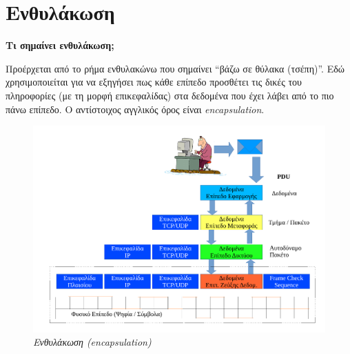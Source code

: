 %
%
%
\setcounter{section}{2}
%
\section{Ενθυλάκωση}
\begin{inthebox}
\textbf{Τι σημαίνει ενθυλάκωση;}

Προέρχεται από το ρήμα ενθυλακώνω που σημαίνει ``βάζω σε θύλακα (τσέπη)''. Εδώ χρησιμοποιείται για να εξηγήσει πως κάθε επίπεδο προσθέτει τις δικές του πληροφορίες (με τη μορφή επικεφαλίδας) στα δεδομένα που έχει λάβει από το πιο πάνω επίπεδο. Ο αντίστοιχος αγγλικός όρος είναι \emph{encapsulation}.\\
\end{inthebox}

\begin{figure}[!ht]
  \centering
  \includegraphics[width=1.00\textwidth]{images/chapter1/1-3}
  \caption {\textsl{Ενθυλάκωση (encapsulation)}}
  \label{1-3}
\end{figure}

